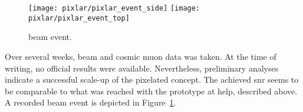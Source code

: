 \begin{figure}[htb]
	\centering
	\texttt{[image: pixlar/pixlar\_event\_side]}
	\texttt{[image: pixlar/pixlar\_event\_top]}
	\caption[\pixlar{} beam event]{%
		\pixlar{} beam event.
	}
	\label{fig:pixlar_event}
\end{figure}

Over several weeks, beam and cosmic muon data was taken.
At the time of writing, no official results were available.
Nevertheless, preliminary analyses indicate a successful scale-up of the pixelated \lartpc{} concept.
The achieved \gls{snr} seems to be comparable to what was reached with the prototype at \gls{help}, described above.
A recorded beam event is depicted in Figure~\ref{fig:pixlar_event}.